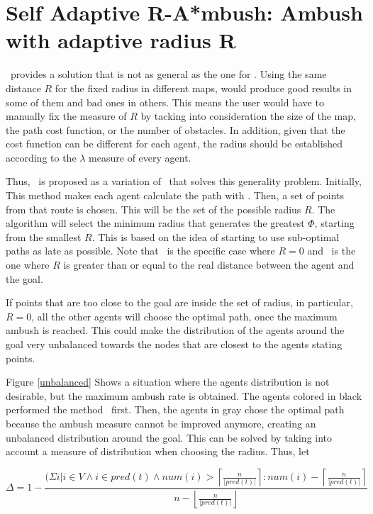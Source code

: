 \section{ Self Adaptive R-A*mbush: Ambush with adaptive radius R}

\rambush\  provides a solution that is not as general as the one for
 \ambush.  Using the same distance $R$ for the fixed radius 
 in different maps, would produce good results in some of them 
 and bad ones in others. This means the user would have to manually 
 fix the measure of $R$ by tacking into consideration the size of 
 the map, the path cost function, or the number of obstacles. 
 In addition, given that  the cost function can be different for each 
 agent, the radius should be established according to the 
 $\lambda$ measure of every agent.
  
Thus, \sarambush\ is proposed as a variation of \rambush\ that 
solves this generality problem. Initially, This method makes each
 agent calculate the path with \astar. Then, a set of points from
  that route is chosen.  This will  be the set of the possible radius 
  $R$. The algorithm will select the minimum radius that generates 
  the greatest $\Phi$, starting from the smallest $R$.  
  This is based on the idea of starting to use sub-optimal 
  paths as late as possible.  Note that \astar\ is the specific 
  case where $R=0$ and \ambush\ is the one where $R$ is greater 
  than or equal to the real distance between the agent and the goal.  

If points that are too close to the goal are inside the set of radius, 
in particular, $R=0$, all the other agents will choose the optimal path, 
once the maximum ambush is reached. This could make the 
distribution of the agents around the goal very unbalanced towards 
the nodes that are closest to the agents stating points.

Figure \ref{unbalanced} Shows a situation where the agents distribution 
is not desirable, but the maximum ambush rate is obtained.	The agents 
colored in black performed the method \sarambush\ first. Then, the agents
in gray chose the optimal path because the ambush measure cannot 
be improved anymore, creating an unbalanced distribution around the
goal. This can be solved by taking into account a measure
 of distribution when choosing the radius. Thus, let 

\begin{equation}
  \Delta = 1-\dfrac{(\Sigma i |  i \in V 
  						\wedge i \in pred(t)
  						\wedge num(i) > 
  							\left\lceil \frac{n}{|pred(t)|} \right\rceil 
  					:  num(i) - 
  						\left\lceil \frac{n}{|pred(t)|} \right\rceil}		
  						{n-\left\lfloor \frac{n}{|pred(t)|} \right\rfloor}
\end{equation}

